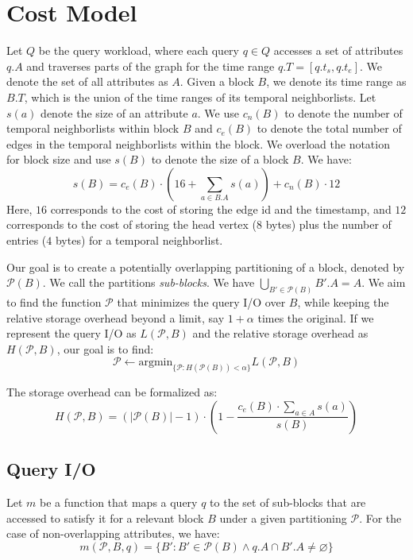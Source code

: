 \documentclass[twocolumn]{svjour3}          %
\let\emptyset\varnothing
\begin{document}
\section{Cost Model}
Let $Q$ be the query workload, where each query $q\in Q$ accesses a set of
attributes $q.A$ and traverses parts of the graph for the time range
$q.T=[q.t_s,q.t_e]$. We denote the set of all attributes as $A$. Given a block
$B$, we denote its time range as $B.T$, which is the union of the time ranges
of its temporal neighborlists. Let $s(a)$ denote the size of an attribute $a$.
We use $c_n(B)$ to denote the number of temporal neighborlists within block
$B$ and $c_e(B)$ to denote the total number of edges in the temporal
neighborlists within the block. We overload the notation for block size and
use $s(B)$ to denote the size of a block $B$. We have: 
\begin{equation}
s(B) = c_e(B) \cdot \left(16 + \sum_{a\in B.A} s(a)\right) + c_n(B) \cdot 12  
\end{equation}
Here, $16$ corresponds to the cost of storing the edge id and the timestamp,
and $12$ corresponds to the cost of storing the head vertex ($8$ bytes) plus
the number of entries ($4$ bytes) for a temporal neighborlist. 

Our goal is to create a potentially overlapping partitioning of a block,
denoted by $\mathcal{P}(B)$. We call the partitions \emph{sub-blocks}. We have
$\bigcup_{B'\in \mathcal{P}(B)} B'.A = A$. We aim to find the function
$\mathcal{P}$ that minimizes the query I/O over $B$, while keeping the
relative storage overhead beyond a limit, say $1+\alpha$ times the original.
If we represent the query I/O as $L(\mathcal{P}, B)$ and the relative storage
overhead as $H(\mathcal{P}, B)$, our goal is to find:
\begin{equation}
\mathcal{P} \leftarrow \mbox{argmin}_{\{\mathcal{P}: H(\mathcal{P}(B)) < \alpha\}} L(\mathcal{P},B)
\end{equation}

The storage overhead can be formalized as:
\begin{equation}
H(\mathcal{P}, B) = (|\mathcal{P}(B)|-1)\cdot\left(1-\frac{c_e(B)\cdot \sum_{a\in A} s(a)}{s(B)}\right) 
\end{equation}

\subsection{Query I/O}

Let $m$ be a function that maps a query $q$ to the set of sub-blocks that are
accessed to satisfy it for a relevant block $B$ under a given partitioning
$\mathcal{P}$. For the case of non-overlapping attributes, we have:
\begin{equation}
m(\mathcal{P}, B, q) = \{B': B'\in \mathcal{P}(B) \wedge q.A \cap B'.A \ne \emptyset\}  
\end{equation}
\end{document}
